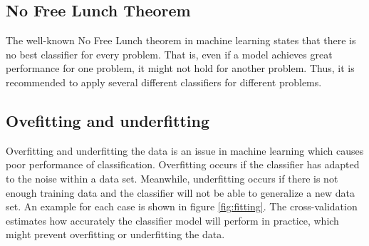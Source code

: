\documentclass[USenglish]{ifimaster}  %
\begin{document}
\subsection{No Free Lunch Theorem} \label{seq:nofree}
The well-known No Free Lunch theorem \cite{NOFREELUNCH} in machine learning states that there is no best classifier for every problem. That is, even if a model achieves great performance for one problem, it might not hold for another problem. Thus, it is recommended to apply several different classifiers for different problems.
	
\subsection{Ovefitting and underfitting}
Overfitting and underfitting the data is an issue in machine learning which causes poor performance of classification. Overfitting occurs if the classifier has adapted to the noise within a data set. Meanwhile, underfitting occurs if there is not enough training data and the classifier will not be able to generalize a new data set. An example for each case is shown in figure \ref{fig:fitting}. The cross-validation estimates how accurately the classifier model will perform in practice, which might prevent overfitting or underfitting the data.
\end{document}
